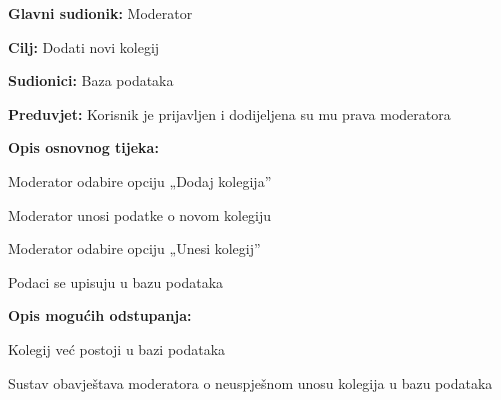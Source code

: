 				
					\noindent {}
					\begin{packed_item}
						
						\item \textbf{Glavni sudionik: }Moderator
						\item  \textbf{Cilj:} Dodati novi kolegij
						\item  \textbf{Sudionici:} Baza podataka
						\item  \textbf{Preduvjet:} Korisnik je prijavljen i dodijeljena su mu prava moderatora
						\item  \textbf{Opis osnovnog tijeka:}
						
						\item[] \begin{packed_enum}
							\item Moderator odabire opciju „Dodaj kolegija”
							\item Moderator unosi podatke o novom kolegiju  
							\item Moderator odabire opciju „Unesi kolegij”
							\item Podaci se upisuju u bazu podataka
							
						\end{packed_enum}
						
						\item  \textbf{Opis mogućih odstupanja:}
						
						\item[] \begin{packed_item}
							
							\item[3.a] Kolegij već postoji u bazi podataka
							\item[] \begin{packed_enum}
								\item Sustav obavještava moderatora o neuspješnom unosu kolegija u bazu podataka
							\end{packed_enum}
							
						\end{packed_item}
					\end{packed_item}
				

